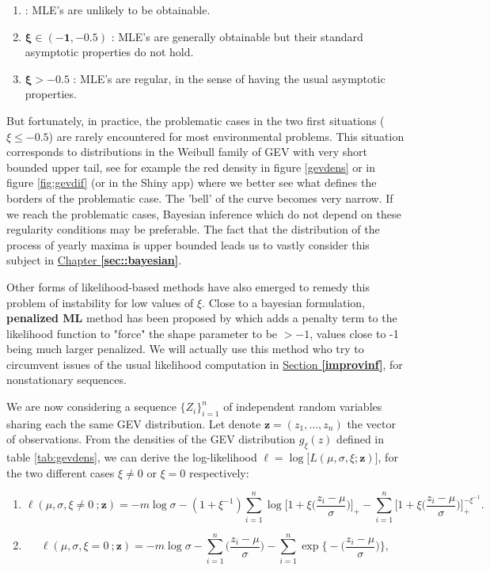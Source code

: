 \begin{enumerate}
	\item\label{it1lik}  : MLE's are unlikely to be obtainable.%
	\item $\boldsymbol{\xi\in(-1,-0.5)}$ : MLE's are generally obtainable but their standard asymptotic properties do not hold.
	\item $\boldsymbol{\xi>-0.5}$ : MLE's are regular, in the sense of having the usual asymptotic properties.
\end{enumerate}
But fortunately, in practice, the problematic cases in the two first situations ($\xi\leq -0.5$) are rarely encountered for most environmental problems. This situation corresponds to distributions in the Weibull family of GEV with very short bounded upper tail, see for example the red density in figure \ref{gevdens} or in figure \ref{fig:gevdif} (or in the Shiny app) where we better see what defines the borders of the problematic case. The 'bell' of the curve becomes very narrow.
If we reach the problematic cases, Bayesian inference which do not depend on these regularity conditions may be preferable. The fact that the distribution of the process of yearly maxima is upper bounded leads us to vastly consider this subject in \hyperref[sec::bayesian]{Chapter \textbf{\ref{sec::bayesian}}}.

Other forms of likelihood-based methods have also emerged to remedy this problem of instability for low values of $\xi$. Close to a bayesian formulation, \textbf{ penalized ML} method has been proposed by \citet{coles_likelihood-based_1999} which adds a penalty term to the likelihood function to "force" the shape parameter to be $>-1$, values close to -1 being much larger penalized. We will actually use this method who try to circumvent issues of the usual likelihood computation in \hyperref[improvinf]{Section \textbf{\ref{improvinf}}}, for nonstationary sequences.

We are now considering a sequence $\{Z_i\}_{i=1}^n$ of independent random variables sharing 
each the same GEV distribution. Let denote $\boldsymbol{z}=(z_1,\dots,z_n)$ the vector of 
observations.
From the densities of the GEV distribution $g_{\xi}(z)$ defined in 
table \ref{tab:gevdens}, we can derive the log-likelihood 
$\ell=\log\big[L(\mu,\sigma,\xi;\boldsymbol{z})\big]$, for the two different cases $\xi\neq 0$ or $\xi=0$ respectively:
\begin{enumerate}
	\item \begin{equation} \label{llik12}
	\ell(\mu,\sigma,\xi\neq 0\ ;\textbf{z})= 
	-m\log\sigma-(1+\xi^{-1})\sum_{i=1}^n\log\bigg[1+\xi\bigg(\frac{z_i-\mu}{\sigma}\bigg)\bigg]_+-\sum_{i=1}^n\bigg[1+\xi\bigg(\frac{z_i-\mu}{\sigma}\bigg)\bigg]_+^{-\xi^{-1}}.
	\end{equation}
	
	\item \begin{equation} \label{llik0}
	\ell(\mu,\sigma,\xi=0\ ;\textbf{z})=-m\log 
	\sigma-\sum_{i=1}^n\bigg(\frac{z_i-\mu}{\sigma}\bigg)-\sum_{i=1}^{n}\exp\bigg\{-\bigg(\frac{z_i-\mu}{\sigma}\bigg)\bigg\},
	\end{equation}
\end{enumerate}

